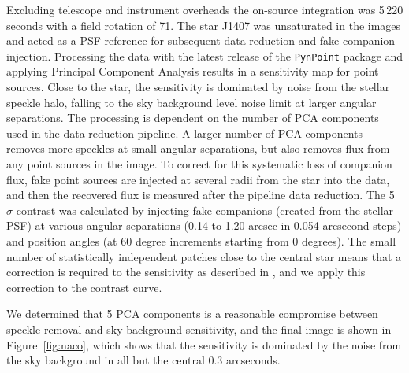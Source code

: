 \documentclass{aa} %
\begin{document}
Excluding telescope and instrument overheads the on-source integration was 5\,220 seconds with a field rotation of 71.
%
The star J1407 was unsaturated in the images and acted as a PSF reference for subsequent data reduction and fake companion injection.
%
Processing the data with the latest release of the \texttt{PynPoint} package \citep{Stolker19} and applying Principal Component Analysis \citep[PCA; ][]{Amara12} results in a sensitivity map for point sources.
%
Close to the star, the sensitivity is dominated by noise from the stellar speckle halo, falling to the sky background level noise limit at larger angular separations.
%
The processing is dependent on the number of PCA components used in the data reduction pipeline.
%
A larger number of PCA components removes more speckles at small angular separations, but also removes flux from any point sources in the image.
%
To correct for this systematic loss of companion flux, fake point sources are injected at several radii from the star into the data, and then the recovered flux is measured after the pipeline data reduction.
%
The 5 $\sigma$ contrast was calculated by injecting fake companions (created from the stellar PSF) at various angular separations (0.14 to 1.20 arcsec in 0.054 arcsecond steps) and position angles (at 60 degree increments starting from 0 degrees).
%
The small number of statistically independent patches close to the central star means that a correction is required to the sensitivity as described in \citet{Mawet14}, and we apply this correction to the contrast curve.

We determined that 5 PCA components is a reasonable compromise between speckle removal and sky background sensitivity, and the final image is shown in Figure~\ref{fig:naco}, which shows that the sensitivity is dominated by the noise from the sky background in all but the central 0.3 arcseconds.
\end{document}
